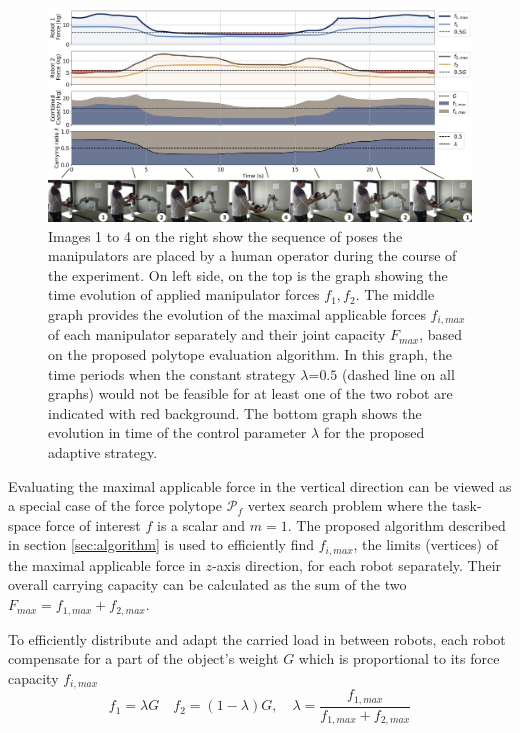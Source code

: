 \begin{figure}
    \centering
    \includegraphics[width=\linewidth]{Papers/images/exp_no_anim.jpg}
    \caption{Images 1 to 4 on the right show the sequence of poses the manipulators are placed by a human operator during the course of the experiment. On left side, on the top is the graph showing the time evolution of applied manipulator forces $f_1,f_2$. The middle graph provides the evolution of the maximal applicable forces $f_{i,max}$ of each manipulator separately and their joint capacity $F_{max}$, based on the proposed polytope evaluation algorithm. In this graph,  the time periods when the constant strategy $\lambda$=$0.5$ (dashed line on all graphs) would not be feasible for at least one of the two robot are indicated with red background. The bottom graph shows the  evolution in time of the control parameter $\lambda$ for the proposed adaptive strategy.}
    \label{fig:dual_manip}
\end{figure}


Evaluating the maximal applicable force in the vertical direction can be viewed as a special case of the force polytope $\mathcal{P}_f$ vertex search problem where the task-space force of interest $f$ is a scalar and $m=1$.
The proposed algorithm described in section \ref{sec:algorithm} is used to efficiently find $f_{i,max}$, the limits (vertices) of the maximal applicable force in $z$-axis direction, for each robot separately.  Their overall carrying capacity can be calculated as the sum of the two $F_{max} = f_{1,max} + f_{2,max}$.

To efficiently distribute and adapt the carried load in between robots, each robot compensate for a part of the object's weight $G$ which is proportional to its force capacity  $f_{i,max}$  
\begin{equation}
   f_1 = \lambda G \quad f_2 = (1-\lambda)G,\quad \lambda = \frac{f_{1,max}}{f_{1,max} + f_{2,max}}
\end{equation}
 
